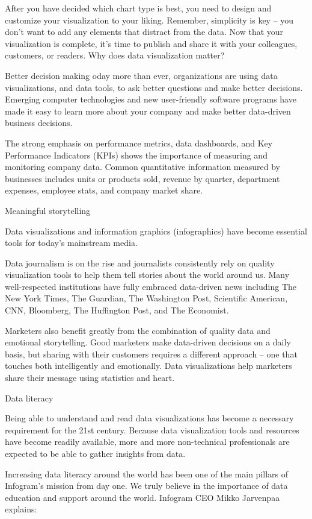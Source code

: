 After you have decided which chart type is best, you need to design and customize your visualization to your liking. Remember, simplicity is key – you don’t want to add any elements that distract from the data. Now that your visualization is complete, it’s time to publish and share it with your colleagues, customers, or readers.
Why does data visualization matter?

Better decision making
oday more than ever, organizations are using data visualizations, and data tools, to ask better questions and make better decisions. Emerging computer technologies and new user-friendly software programs have made it easy to learn more about your company and make better data-driven business decisions.

The strong emphasis on performance metrics, data dashboards, and Key Performance Indicators (KPIs) shows the importance of measuring and monitoring company data. Common quantitative information measured by businesses includes units or products sold, revenue by quarter, department expenses, employee stats, and company market share.

Meaningful storytelling

Data visualizations and information graphics (infographics) have become essential tools for today’s mainstream media.

Data journalism is on the rise and journalists consistently rely on quality visualization tools to help them tell stories about the world around us. Many well-respected institutions have fully embraced data-driven news including The New York Times, The Guardian, The Washington Post, Scientific American, CNN, Bloomberg, The Huffington Post, and The Economist.

Marketers also benefit greatly from the combination of quality data and emotional storytelling. Good marketers make data-driven decisions on a daily basis, but sharing with their customers requires a different approach – one that touches both intelligently and emotionally. Data visualizations help marketers share their message using statistics and heart.

Data literacy


Being able to understand and read data visualizations has become a necessary requirement for the 21st century. Because data visualization tools and resources have become readily available, more and more non-technical professionals are expected to be able to gather insights from data.

Increasing data literacy around the world has been one of the main pillars of Infogram’s mission from day one. We truly believe in the importance of data education and support around the world.
Infogram CEO Mikko Jarvenpaa explains:

